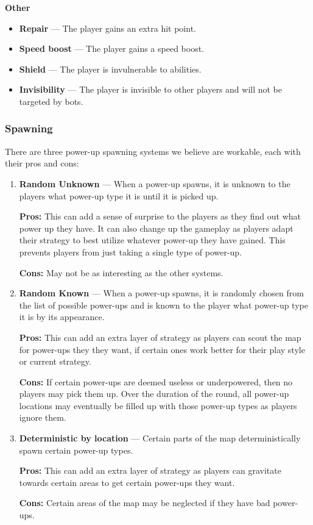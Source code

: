 \documentclass{article}
\theoremstyle{definition}
\begin{document}
\textbf{Other}
\begin{itemize}
  \item \textbf{Repair} --- The player gains an extra hit point.
  \item \textbf{Speed boost} --- The player gains a speed boost.
  \item \textbf{}\textbf{Shield} --- The player is invulnerable to abilities.
  \item \textbf{Invisibility} --- The player is invisible to other players and
    will not be targeted by bots.
\end{itemize}

\subsubsection{Spawning}

There are three power-up spawning systems we believe are workable, each with
their pros and cons:

\begin{enumerate}
  \item \textbf{Random Unknown} --- When a power-up spawns, it is unknown to
    the players what power-up type it is until it is picked up.

    \textbf{Pros:} This can add a sense of surprise to the players as they find
    out what power up they have. It can also change up the gameplay as players
    adapt their strategy to best utilize whatever power-up they have gained.
    This prevents players from just taking a single type of power-up.

    \textbf{Cons:} May not be as interesting as the other systems.
  \item \textbf{Random Known} --- When a power-up spawns, it is randomly chosen
    from the list of possible power-ups and is known to the player what
    power-up type it is by its appearance.

    \textbf{Pros:} This can add an extra layer of strategy as players can
    scout the map for power-ups they they want, if certain ones work better
    for their play style or current strategy.

    \textbf{Cons:} If certain power-ups are deemed useless or underpowered,
    then no players may pick them up. Over the duration of the round, all
    power-up locations may eventually be filled up with those power-up types as
    players ignore them.
  \item \textbf{Deterministic by location} --- Certain parts of the map
    deterministically spawn certain power-up types.

    \textbf{Pros:} This can add an extra layer of strategy as players can
    gravitate towards certain areas to get certain power-ups they want.

    \textbf{Cons:} Certain areas of the map may be neglected if they have bad
    power-ups.
\end{enumerate}
\end{document}
